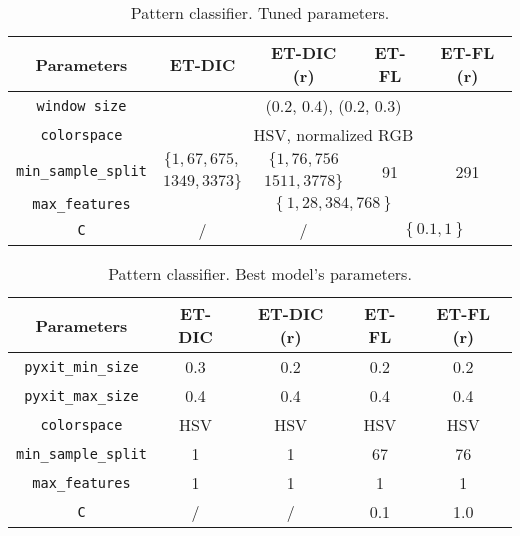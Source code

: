 \begin{table}
	\center 
	\begin{tabular}{|c|cccc|}
		\hline
		Parameters & ET-DIC & ET-DIC (r) & ET-FL & ET-FL (r) \\
		\hline		
		\texttt{window size} & \multicolumn{4}{|c|}{(0.2, 0.4), (0.2, 0.3)} \\
		\texttt{colorspace} & \multicolumn{4}{|c|}{HSV, normalized RGB} \\
		\multirow{2}{*}{\texttt{min\_sample\_split}} & $\{1, 67, 675,$ &  $\{1, 76, 756$ & \multirow{2}{*}{91} & \multirow{2}{*}{291}\\
		& $1349, 3373\}$ & $1511, 3778\}$ & & \\
		\texttt{max\_features} & \multicolumn{4}{|c|}{$\left\{1, 28, 384, 768\right\}$}\\ 
		\texttt{C} & / & / & \multicolumn{2}{c|}{$\left\{0.1, 1\right\}$}\\
		\hline
	\end{tabular}
	\caption{Pattern classifier. Tuned parameters.}
	\label{tab:app_pattern_classif_tuned}
\end{table}

\begin{table}
	\small
	\center 
	\begin{tabular}{|c|c|c|c|c|}
		\hline
		Parameters & ET-DIC & ET-DIC (r) & ET-FL & ET-FL (r) \\
		\hline		
		\texttt{pyxit\_min\_size} & 0.3 & 0.2 & 0.2 & 0.2\\
		\texttt{pyxit\_max\_size} & 0.4 & 0.4 & 0.4 & 0.4 \\
		\texttt{colorspace} & HSV & HSV & HSV & HSV \\
		\texttt{min\_sample\_split} & 1 & 1 & 67 & 76 \\
		\texttt{max\_features} & 1 & 1 & 1 & 1 \\ 
		\texttt{C} & / & / & 0.1 & 1.0 \\
		\hline
	\end{tabular}
	\caption{Pattern classifier. Best model's parameters.}
	\label{tab:pattern_classif_best_params}
\end{table}

